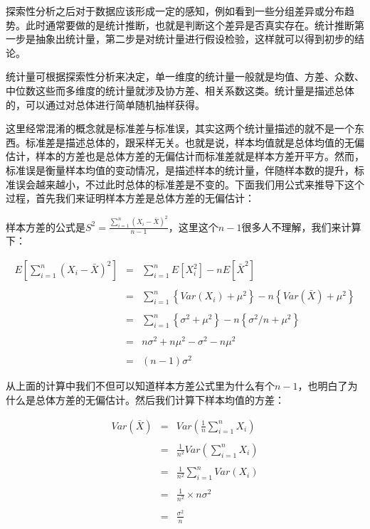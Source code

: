 \documentclass[]{tufte-book}
\begin{document}
探索性分析之后对于数据应该形成一定的感知，例如看到一些分组差异或分布趋势。此时通常要做的是统计推断，也就是判断这个差异是否真实存在。统计推断第一步是抽象出统计量，第二步是对统计量进行假设检验，这样就可以得到初步的结论。

统计量可根据探索性分析来决定，单一维度的统计量一般就是均值、方差、众数、中位数这些而多维度的统计量就涉及协方差、相关系数这类。统计量是描述总体的，可以通过对总体进行简单随机抽样获得。

这里经常混淆的概念就是标准差与标准误，其实这两个统计量描述的就不是一个东西。标准差是描述总体的，跟采样无关。也就是说，样本均值就是总体均值的无偏估计，样本的方差也是总体方差的无偏估计而标准差就是样本方差开平方。然而，标准误是衡量样本均值的变动情况，是描述样本的统计量，伴随样本数的提升，标准误会越来越小，不过此时总体的标准差是不变的。下面我们用公式来推导下这个过程，首先我们来证明样本方差是总体方差的无偏估计：

样本方差的公式是\(S^2 = \frac{\sum_{i=1}^n (X_i - \bar X)^2}{n-1}\)，这里这个\(n-1\)很多人不理解，我们来计算下：

\begin{eqnarray*}
    E\left[\sum_{i=1}^n (X_i - \bar X)^2\right] & = & \sum_{i=1}^n E\left[X_i^2\right] - n E\left[\bar X^2\right] \\ \\
    & = & \sum_{i=1}^n \left\{Var(X_i) + \mu^2\right\} - n \left\{Var(\bar X) + \mu^2\right\} \\ \\
    & = & \sum_{i=1}^n \left\{\sigma^2 + \mu^2\right\} - n \left\{\sigma^2 / n + \mu^2\right\} \\ \\
    & = & n \sigma^2 + n \mu ^ 2 - \sigma^2 - n \mu^2 \\ \\
    & = & (n - 1) \sigma^2
\end{eqnarray*}

从上面的计算中我们不但可以知道样本方差公式里为什么有个\(n-1\)，也明白了为什么是总体方差的无偏估计。然后我们计算下样本均值的方差：

\begin{eqnarray*}
    Var(\bar X) & = & Var \left( \frac{1}{n}\sum_{i=1}^n X_i \right)\\ \\
    & = & \frac{1}{n^2} Var\left(\sum_{i=1}^n X_i \right)\\ \\
    & = & \frac{1}{n^2} \sum_{i=1}^n Var(X_i) \\ \\
    & = & \frac{1}{n^2} \times n\sigma^2 \\ \\
    & = & \frac{\sigma^2}{n}
\end{eqnarray*}
\end{document}
